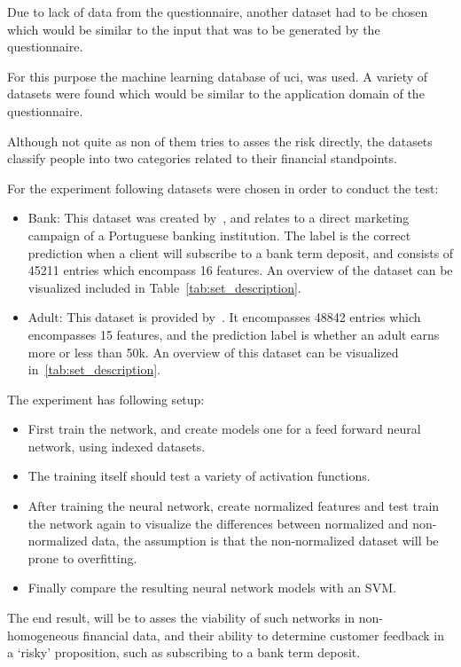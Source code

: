 \documentclass[12pt]{article}
\begin{document}
Due to lack of data from the questionnaire, another dataset had to be chosen which would be similar to the input that was to be generated by the questionnaire. 

For this purpose the machine learning database of \gls{uci}, was used. A variety of datasets were found which would be similar to the application domain of the questionnaire.

Although not quite as non of them tries to asses the risk directly, the datasets classify people into two categories related to their financial standpoints.

For the experiment following datasets were chosen in order to conduct the test:

\begin{itemize}
    \item Bank: This dataset was created by~\citep{bank.names}, and relates to a direct marketing campaign of a Portuguese banking institution. The label is the correct prediction when a client will subscribe to a bank term deposit, and consists of 45211 entries which encompass 16 features. An overview of the dataset can be visualized included in Table~\ref{tab:set_description}.

    \item Adult: This dataset is provided by~\citep{adult.names}. It encompasses 48842 entries which encompasses 15 features, and the prediction label is whether an adult earns more or less than 50k. An overview of this dataset can be visualized in~\ref{tab:set_description}.
\end{itemize}

The experiment has following setup:
\begin{itemize}
    \item First train the network, and create models one for a feed forward neural network, using indexed datasets.
    \item The training itself should test a variety of activation functions.
    \item After training the neural network, create normalized features and test train the network again to visualize the differences between normalized and non-normalized data, the assumption is that the non-normalized dataset will be prone to overfitting.
    \item Finally compare the resulting neural network models with an SVM\@.
\end{itemize}

The end result, will be to asses the viability of such networks in non-homogeneous financial data, and their ability to determine customer feedback in a `risky' proposition, such as subscribing to a bank term deposit.
\end{document}
